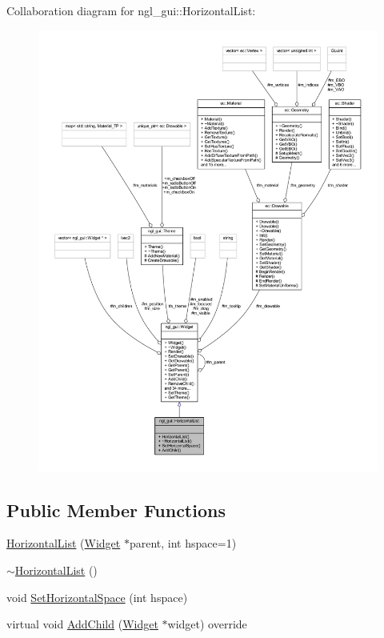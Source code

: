 Collaboration diagram for ngl\+\_\+gui\+:\+:Horizontal\+List\+:
\nopagebreak
\begin{figure}[H]
\begin{center}
\leavevmode
\includegraphics[width=350pt]{classngl__gui_1_1_horizontal_list__coll__graph}
\end{center}
\end{figure}
\subsection*{Public Member Functions}
\begin{DoxyCompactItemize}
\item 
\mbox{\hyperlink{classngl__gui_1_1_horizontal_list_a2b94e64efbf77b487aa08d49e23e1e41}{Horizontal\+List}} (\mbox{\hyperlink{classngl__gui_1_1_widget}{Widget}} $\ast$parent, int hspace=1)
\item 
\mbox{\hyperlink{classngl__gui_1_1_horizontal_list_a91fa289dccfaadf3dd043b1e945b18e6}{$\sim$\+Horizontal\+List}} ()
\item 
void \mbox{\hyperlink{classngl__gui_1_1_horizontal_list_affeae11b3f463f65d870938e525ab14d}{Set\+Horizontal\+Space}} (int hspace)
\item 
virtual void \mbox{\hyperlink{classngl__gui_1_1_horizontal_list_a3dcb8fc4e780268899d12ecc3980bc16}{Add\+Child}} (\mbox{\hyperlink{classngl__gui_1_1_widget}{Widget}} $\ast$widget) override
\end{DoxyCompactItemize}
